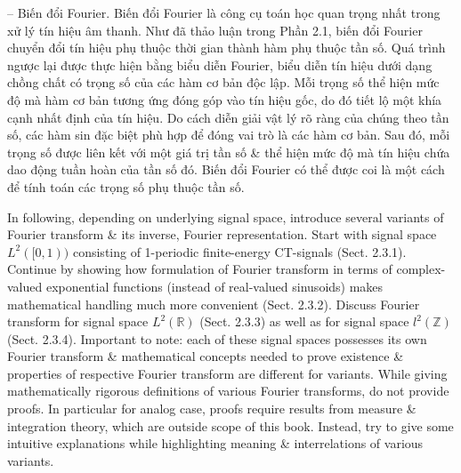 \documentclass{article}
\begin{document}
\begin{itemize}
\begin{itemize}
		-- {\sf Biến đổi Fourier.} Biến đổi Fourier là công cụ toán học quan trọng nhất trong xử lý tín hiệu âm thanh. Như đã thảo luận trong Phần 2.1, biến đổi Fourier chuyển đổi tín hiệu phụ thuộc thời gian thành hàm phụ thuộc tần số. Quá trình ngược lại được thực hiện bằng biểu diễn Fourier, biểu diễn tín hiệu dưới dạng chồng chất có trọng số của các hàm cơ bản độc lập. Mỗi trọng số thể hiện mức độ mà hàm cơ bản tương ứng đóng góp vào tín hiệu gốc, do đó tiết lộ một khía cạnh nhất định của tín hiệu. Do cách diễn giải vật lý rõ ràng của chúng theo tần số, các hàm sin đặc biệt phù hợp để đóng vai trò là các hàm cơ bản. Sau đó, mỗi trọng số được liên kết với một giá trị tần số \& thể hiện mức độ mà tín hiệu chứa dao động tuần hoàn của tần số đó. Biến đổi Fourier có thể được coi là một cách để tính toán các trọng số phụ thuộc tần số.
		
		In following, depending on underlying signal space, introduce several variants of Fourier transform \& its inverse, Fourier representation. Start with signal space $L^2([0,1))$ consisting of 1-periodic finite-energy CT-signals (Sect. 2.3.1). Continue by showing how formulation of Fourier transform in terms of complex-valued exponential functions (instead of real-valued sinusoids) makes mathematical handling much more convenient (Sect. 2.3.2). Discuss Fourier transform for signal space $L^2(\mathbb{R})$ (Sect. 2.3.3) as well as for signal space $l^2(\mathbb{Z})$ (Sect. 2.3.4). Important to note: each of these signal spaces possesses its own Fourier transform \& mathematical concepts needed to prove existence \& properties of respective Fourier transform are different for variants. While giving mathematically rigorous definitions of various Fourier transforms, do not provide proofs. In particular for analog case, proofs require results from measure \& integration theory, which are outside scope of this book. Instead, try to give some intuitive explanations while highlighting meaning \& interrelations of various variants.
		

\end{itemize}
\end{itemize}
\end{document}
